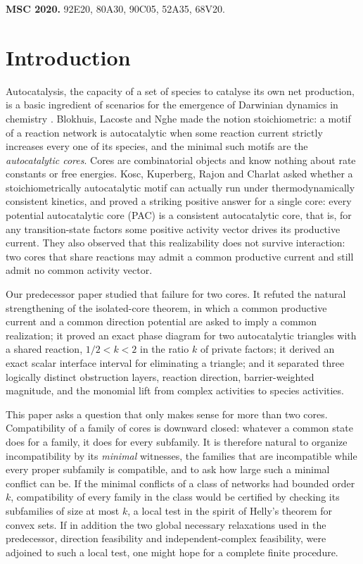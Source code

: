 \documentclass[11pt,a4paper]{article}
\theoremstyle{plain}
\theoremstyle{definition}
\theoremstyle{remark}
\begin{document}
\medskip
\noindent\textbf{MSC 2020.} 92E20, 80A30, 90C05, 52A35, 68V20.

\section{Introduction}\label{sec:intro}

Autocatalysis, the capacity of a set of species to catalyse its own net production, is a basic ingredient of scenarios for the emergence of Darwinian dynamics in chemistry \citep{blokhuis2020,hordijk2004,steel2020}. Blokhuis, Lacoste and Nghe \citep{blokhuis2020} made the notion stoichiometric: a motif of a reaction network is autocatalytic when some reaction current strictly increases every one of its species, and the minimal such motifs are the \emph{autocatalytic cores}. Cores are combinatorial objects and know nothing about rate constants or free energies. Kosc, Kuperberg, Rajon and Charlat \citep{kosc2025} asked whether a stoichiometrically autocatalytic motif can actually run under thermodynamically consistent kinetics, and proved a striking positive answer for a single core: every potential autocatalytic core (PAC) is a consistent autocatalytic core, that is, for any transition-state factors some positive activity vector drives its productive current. They also observed that this realizability does not survive interaction: two cores that share reactions may admit a common productive current and still admit no common activity vector.

Our predecessor paper \citep{tcic2026} studied that failure for two cores. It refuted the natural strengthening of the isolated-core theorem, in which a common productive current and a common direction potential are asked to imply a common realization; it proved an exact phase diagram for two autocatalytic triangles with a shared reaction, $1/2<k<2$ in the ratio $k$ of private factors; it derived an exact scalar interface interval for eliminating a triangle; and it separated three logically distinct obstruction layers, reaction direction, barrier-weighted magnitude, and the monomial lift from complex activities to species activities.

This paper asks a question that only makes sense for more than two cores. Compatibility of a family of cores is downward closed: whatever a common state does for a family, it does for every subfamily. It is therefore natural to organize incompatibility by its \emph{minimal} witnesses, the families that are incompatible while every proper subfamily is compatible, and to ask how large such a minimal conflict can be. If the minimal conflicts of a class of networks had bounded order $k$, compatibility of every family in the class would be certified by checking its subfamilies of size at most $k$, a local test in the spirit of Helly's theorem \citep{helly1923,eckhoff1993} for convex sets. If in addition the two global necessary relaxations used in the predecessor, direction feasibility and independent-complex feasibility, were adjoined to such a local test, one might hope for a complete finite procedure.
\end{document}
